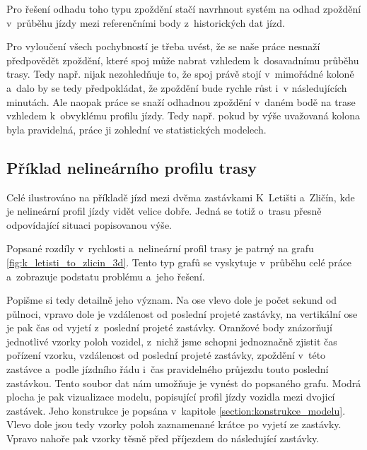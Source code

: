 \bigbreak

Pro řešení odhadu toho typu zpoždění stačí navrhnout systém na odhad zpoždění v~průběhu jízdy mezi referenčními body z~historických dat jízd.

\bigbreak

Pro vyloučení všech pochybností je třeba uvést, že se naše práce nesnaží předpovědět zpoždění, které spoj může nabrat vzhledem k~dosavadnímu průběhu trasy. Tedy např. nijak nezohledňuje to, že spoj právě stojí v~mimořádné koloně a~dalo by se tedy předpokládat, že zpoždění bude rychle růst i~v následujících minutách. Ale naopak práce se snaží odhadnou zpoždění v~daném bodě na trase vzhledem k~obvyklému profilu jízdy. Tedy např. pokud by výše uvažovaná kolona byla pravidelná, práce ji zohlední ve statistických modelech.


\subsection{Příklad nelineárního profilu trasy} \label{subsection:priklad_nelinearni_trasa}

Celé ilustrováno na příkladě jízd mezi dvěma zastávkami K~Letišti a~Zličín, kde je nelineární profil jízdy vidět velice dobře. Jedná se totiž o~trasu přesně odpovídající situaci popisovanou výše.

\bigbreak

Popsané rozdíly v~rychlosti a~nelineární profil trasy je patrný na grafu \ref{fig:k_letisti_to_zlicin_3d}. Tento typ grafů se vyskytuje v~průběhu celé práce a~zobrazuje podstatu problému a~jeho řešení.

\bigbreak

Popišme si tedy detailně jeho význam. Na ose vlevo dole je počet sekund od půlnoci, vpravo dole je vzdálenost od poslední projeté zastávky, na vertikální ose je pak čas od vyjetí z~poslední projeté zastávky. Oranžové body znázorňují jednotlivé vzorky poloh vozidel, z~nichž jsme schopni jednoznačně zjistit čas pořízení vzorku, vzdálenost od poslední projeté zastávky, zpoždění v~této zastávce a~podle jízdního řádu i~čas pravidelného průjezdu touto poslední zastávkou. Tento soubor dat nám umožňuje je vynést do popsaného grafu. Modrá plocha je pak vizualizace modelu, popisující profil jízdy vozidla mezi dvojicí zastávek. Jeho konstrukce je popsána v~kapitole \ref{section:konstrukce_modelu}. Vlevo dole jsou tedy vzorky poloh zaznamenané krátce po vyjetí ze zastávky. Vpravo nahoře pak vzorky těsně před příjezdem do následující zastávky.

